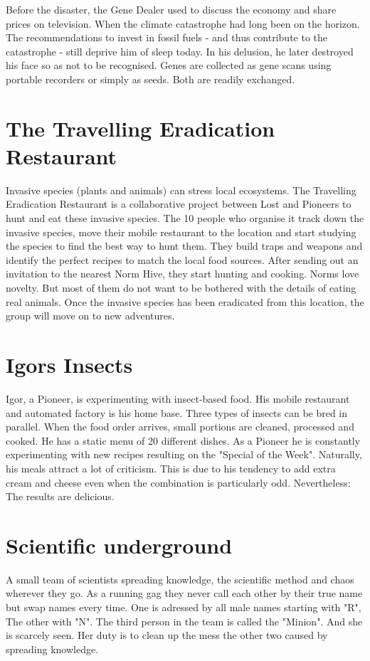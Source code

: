Before the disaster, the Gene Dealer used to discuss the economy and share prices on television. When the climate catastrophe had long been on the horizon. The recommendations to invest in fossil fuels - and thus contribute to the catastrophe - still deprive him of sleep today. In his delusion, he later destroyed his face so as not to be recognised.
Genes are collected as gene scans using portable recorders or simply as seeds. Both are readily exchanged.

\section{The Travelling Eradication Restaurant}
\label{sec:Eradication Restaurant}

Invasive species (plants and animals) can stress local ecosystems. The Travelling Eradication Restaurant is a collaborative project between Lost and Pioneers to hunt and eat these invasive species.
The 10 people who organise it track down the invasive species, move their mobile restaurant to the location and start studying the species to find the best way to hunt them. They build traps and weapons and identify the perfect recipes to match the local food sources.
After sending out an invitation to the nearest Norm Hive, they start hunting and cooking.
Norms love novelty. But most of them do not want to be bothered with the details of eating real animals.
Once the invasive species has been eradicated from this location, the group will move on to new adventures.

\section{Igors Insects}
\label{sec:Igors Insects}

Igor, a Pioneer, is experimenting with insect-based food. His mobile restaurant and automated factory is his home base. Three types of insects can be bred in parallel. When the food order arrives, small portions are cleaned, processed and cooked.
He has a static menu of 20 different dishes. As a Pioneer he is constantly experimenting with new recipes resulting on the "Special of the Week".
Naturally, his meals attract a lot of criticism. This is due to his tendency to add extra cream and cheese even when the combination is particularly odd. Nevertheless: The results are delicious.

\section{Scientific underground}
\label{sec:Scientific Underground}
A small team of scientists spreading knowledge, the scientific method and chaos wherever they go. As a running gag they never call each other by their true name but swap names every time. One is adressed by all male names starting with "R",
The other with "N". The third person in the team is called the "Minion". And she is scarcely seen. Her duty is to clean up the mess the other two caused by spreading knowledge.


